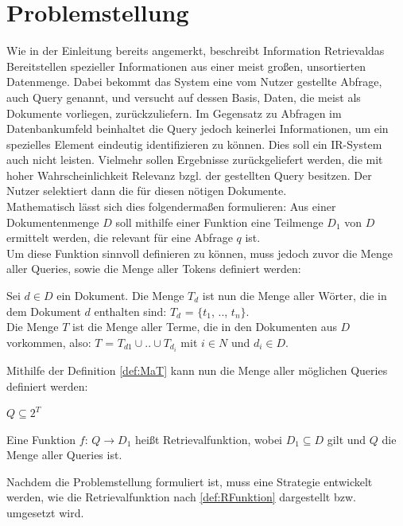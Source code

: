 \section{Problemstellung}
Wie in der Einleitung bereits angemerkt, beschreibt \glqq Information Retrieval\grqq das Bereitstellen spezieller Informationen aus einer meist großen, unsortierten Datenmenge. Dabei bekommt das System eine vom Nutzer gestellte Abfrage, auch Query genannt, und versucht auf dessen Basis, Daten, die meist als Dokumente vorliegen, zurückzuliefern. Im Gegensatz zu Abfragen im Datenbankumfeld beinhaltet die Query jedoch keinerlei Informationen, um ein spezielles Element eindeutig identifizieren zu können. Dies soll ein IR-System auch nicht leisten. Vielmehr sollen Ergebnisse zurückgeliefert werden, die mit hoher Wahrscheinlichkeit Relevanz bzgl. der gestellten Query besitzen. Der Nutzer selektiert dann die für diesen nötigen Dokumente.
\\
Mathematisch lässt sich dies folgendermaßen formulieren: Aus einer Dokumentenmenge $D$ soll mithilfe einer Funktion eine Teilmenge $D_1$ von $D$ ermittelt werden, die relevant für eine Abfrage $q$ ist.
\\
Um diese Funktion sinnvoll definieren zu können, muss jedoch zuvor die Menge aller Queries, sowie die Menge aller Tokens definiert werden:
\begin{defi}\label{def:MaT}
	Sei $d \in D$ ein Dokument. Die Menge $T_d$ ist nun die Menge aller Wörter, die in dem Dokument $d$ enthalten sind: $T_d$ = $\{$$t_1$, .., $t_n$$\}$.
	\\
	Die Menge $T$ ist die Menge aller Terme, die in den Dokumenten aus $D$ vorkommen, also:
	$T$ = $T_{d1} \cup .. \cup T_{d_i}$ mit $i \in N$ und $d_i \in D$.
\end{defi}
Mithilfe der Definition \ref{def:MaT} kann nun die Menge aller möglichen Queries definiert werden:
\begin{defi}\label{def:MamQ}
	$Q \subseteq 2^T$
\end{defi}
\begin{defi}[Retrievalfunktion]\label{def:RFunktion}
	Eine Funktion $f$: $Q \rightarrow D_1$ heißt Retrievalfunktion, wobei $D_1 \subseteq D$ gilt und $Q$ die Menge aller Queries ist.
\end{defi}
Nachdem die Problemstellung formuliert ist, muss eine Strategie entwickelt werden, wie die Retrievalfunktion nach \cref{def:RFunktion} dargestellt bzw. umgesetzt wird.
\\
